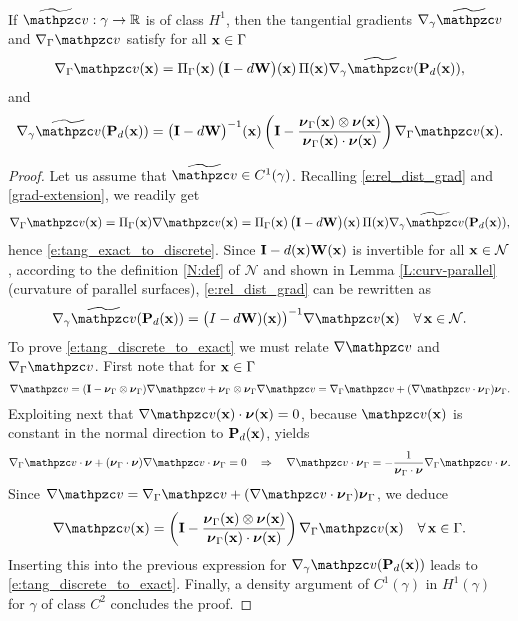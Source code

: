 \begin{lemma}\label{L:tan-grads}
If $\wv:\gamma\to\mathbb{R}$ is of class $H^1$, then the tangential
gradients $\nabla_\gamma\wv$ and $\nabla_\Gamma\tv$ satisfy for all
${\bf x}\in\Gamma$
%
\begin{equation}\label{e:tang_exact_to_discrete}
  \nabla_\Gamma \tv(\bx) = \Pi_\Gamma(\bx) \, \big(\bI - d \bW\big)(\bx) \, \Pi(\bx)
  \nabla_\gamma \wv(\bP_d(\bx)),
\end{equation}
%
and
%
\begin{equation}\label{e:tang_discrete_to_exact}
\nabla_\gamma \wv(\bP_d(\bx)) = \big(\bI - d \bW \big)^{-1}(\bx)\left(\bI - \frac{\bnu_\Gamma(\bx) \otimes \bnu(\bx)}{\bnu_\Gamma(\bx) \cdot \bnu(\bx)}\right) \nabla_\Gamma \tv(\bx).
\end{equation}
%
\end{lemma}  
%
\begin{proof}
Let us assume that $\wv \in C^1(\gamma)$.
Recalling \eqref{e:rel_dist_grad} and \eqref{grad-extension}, we readily get
%
\[
\nabla_\Gamma \tv(\bx) = \Pi_\Gamma (\bx) \nabla\tv(\bx)
= \Pi_\Gamma (\bx) \, \big(\bI - d \bW\big)(\bx) \, \Pi(\bx)
  \nabla_\gamma \wv(\bP_d(\bx)),
\]
%
hence \eqref{e:tang_exact_to_discrete}. Since ${\bf I}-d({\bf x}){\bf W}({\bf x})$ is invertible
for all ${\bf x}\in\mathcal{N}$, according to the definition \eqref{N:def} of
$\mathcal{N}$ and shown in Lemma \ref{L:curv-parallel} (curvature of parallel
surfaces), \eqref{e:rel_dist_grad} can be rewritten as
%
\[
\nabla_\gamma \wv(\bP_d(\bx)) = \big(I - d \bW)(\bx) \big)^{-1} \nabla \tv(\bx)
\quad\forall \, \bx \in \mathcal N.
\]
%
To prove \eqref{e:tang_discrete_to_exact} we must relate $\nabla \tv$ and
$\nabla_\Gamma \tv$. First note that for ${\bf x}\in\Gamma$
%
\[
\nabla \tv = (\bI - \bnu_\Gamma\otimes\bnu_\Gamma) \nabla\tv
+ \bnu_\Gamma\otimes\bnu_\Gamma \nabla\tv
= \nabla_\Gamma \tv + (\nabla\tv\cdot\bnu_\Gamma) \bnu_\Gamma.
\]
%
Exploiting next that $\nabla \tv(\bx)\cdot\bnu(\bx)=0$, because $\tv(\bx)$ is constant in the normal direction to ${\bf P}_d({\bf x})$, yields
%
\[
 \nabla_\Gamma \tv \cdot \bnu + (\bnu_\Gamma \cdot \bnu) \nabla \tv \cdot \bnu_\Gamma
 =0 \quad\Rightarrow\quad
 \nabla \tv \cdot \bnu_\Gamma = - \frac{1}{\bnu_\Gamma \cdot \bnu}\nabla_\Gamma \tv \cdot \bnu.
 \]
 Since $\nabla\tv = \nabla_\Gamma\tv + (\nabla \tv\cdot\bnu_\Gamma) \bnu_\Gamma$,
 we deduce
 \[
 \nabla \tv(\bx)  = \left(\bI - \frac{\bnu_\Gamma(\bx) \otimes \bnu(\bx)}{\bnu_\Gamma(\bx) \cdot \bnu(\bx)}\right) \nabla_\Gamma \tv(\bx)
 \quad\forall \, \bx\in\Gamma.
 \]
 Inserting this into the previous expression for $\nabla_\gamma \tv(\bP_d(\bx))$
 leads to \eqref{e:tang_discrete_to_exact}.
 Finally, a density argument of $C^1(\gamma)$
 in $H^1(\gamma)$ for $\gamma$ of class $C^2$ concludes the proof.
 \end{proof}

